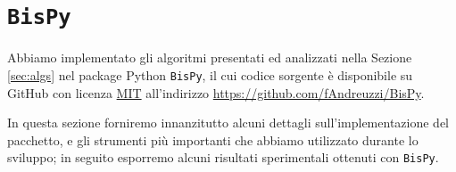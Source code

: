 \section{\texttt{BisPy}}
\label{sec:bispy}
Abbiamo implementato gli algoritmi presentati ed analizzati nella Sezione \ref{sec:algs} nel package Python \texttt{BisPy}, il cui codice sorgente è disponibile su GitHub con licenza \href{https://github.com/fAndreuzzi/BisPy/blob/master/LICENSE}{MIT} all'indirizzo \href{https://github.com/fAndreuzzi/BisPy}{https://github.com/fAndreuzzi/BisPy}.

In questa sezione forniremo innanzitutto alcuni dettagli sull'implementazione del pacchetto, e gli strumenti più importanti che abbiamo utilizzato durante lo sviluppo; in seguito esporremo alcuni risultati sperimentali ottenuti con \texttt{BisPy}.





